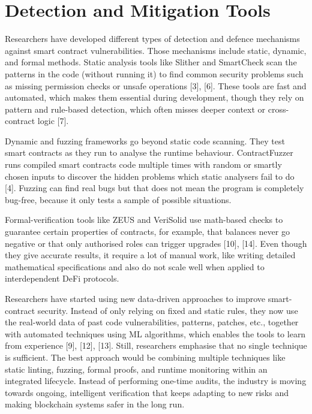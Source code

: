 \documentclass[conference]{IEEEtran}
\begin{document}
\section{Detection and Mitigation Tools}
Researchers have developed different types of detection and defence mechanisms against smart contract vulnerabilities. Those mechanisms include static, dynamic, and formal methods. Static analysis tools like Slither and SmartCheck scan the patterns in the code (without running it) to find common security problems such as missing permission checks or unsafe operations [3], [6]. These tools are fast and automated, which makes them essential during development, though they rely on pattern and rule-based detection, which often misses deeper context or cross-contract logic [7].  
  

Dynamic and fuzzing frameworks go beyond static code scanning. They test smart contracts as they run to analyse the runtime behaviour. ContractFuzzer runs compiled smart contracts code multiple times with random or smartly chosen inputs to discover the hidden problems which static analysers fail to do [4]. Fuzzing can find real bugs but that does not mean the program is completely bug-free, because it only tests a sample of possible situations.  

Formal-verification tools like ZEUS and VeriSolid use math-based checks to guarantee certain properties of contracts, for example, that balances never go negative or that only authorised roles can trigger upgrades [10], [14]. Even though they give accurate results, it require a lot of manual work, like writing detailed mathematical specifications and also do not scale well when applied to interdependent DeFi protocols.  

Researchers have started using new data-driven approaches to improve smart-contract security. Instead of only relying on fixed and static rules, they now use the real-world data of past code vulnerabilities, patterns, patches, etc., together with automated techniques using ML algorithms, which enables the tools to learn from experience [9], [12], [13]. Still, researchers emphasise that no single technique is sufficient. The best approach would be combining multiple techniques like static linting, fuzzing, formal proofs, and runtime monitoring within an integrated lifecycle. Instead of performing one-time audits, the industry is moving towards ongoing, intelligent verification that keeps adapting to new risks and making blockchain systems safer in the long run.
\end{document}
